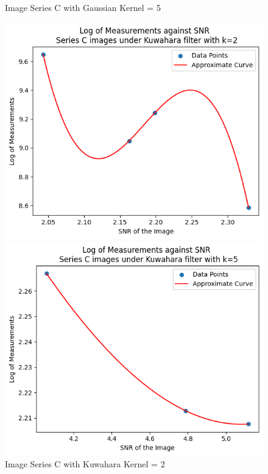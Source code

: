 \documentclass[runningheads]{llncs}
\begin{document}
\begin{figure}[h!]
\begin{minipage}[h]{0.47\linewidth}
\begin{center}
\caption{Image Series C with Gaussian Kernel = 5}
\label{SeriesC_Log_Gaussian_5}
\end{center}
\end{minipage}
\vfill
\vspace{0.2 cm}
\begin{minipage}[h]{0.47\linewidth}
\begin{center}
\includegraphics[width=1\linewidth]{Report/Result_Images/log_seriesC_Kuwahara_2.png} 
\caption{Image Series C with Kuwahara Kernel = 2}
\label{SeriesC_Log_Kuwahara_2}
\end{center}
\end{minipage}
\hfill
\begin{minipage}[h]{0.47\linewidth}
\begin{center}
\includegraphics[width=1\linewidth]{Report/Result_Images/log_seriesC_Kuwahara_5.png} 

\end{center}
\end{minipage}
\end{figure}
\end{document}
